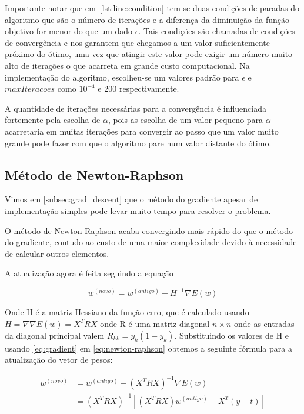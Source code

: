 Importante notar que em~\ref{lst:line:condition} tem-se duas condições de paradas do algoritmo que
são o número de iterações e a diferença da diminuição da função objetivo for menor do que
um dado $\epsilon$. Tais condições são chamadas de condições de convergência e nos garantem
que chegamos a um valor suficientemente próximo do ótimo, uma vez que atingir este valor
pode exigir um número muito alto de iterações o que acarreta em grande custo computacional.
 Na implementação do algoritmo, escolheu-se um valores
padrão para $\epsilon$ e $maxIteracoes$ como $10^{-4}$ e $200$ respectivamente.

A quantidade de iterações necessárias para a convergência é influenciada fortemente pela
escolha de $\alpha$, pois as escolha de um valor pequeno para $\alpha$ acarretaria
em muitas iterações para convergir ao passo que um valor muito grande pode fazer
com que o algoritmo pare num valor distante do ótimo.


\subsection{Método de Newton-Raphson}
\label{subsec:newton-raphson}

Vimos em \ref{subsec:grad_descent} que o método do gradiente apesar de implementação
simples pode levar muito tempo para resolver o problema.

O método de Newton-Raphson acaba convergindo mais rápido do que o método do gradiente,
contudo ao custo de uma maior complexidade devido à necessidade de calcular outros
elementos.

A atualização agora é feita seguindo a equação

\begin{center}
	\begin{equation}\label{eq:newton-raphson}
		w^{ (novo) } = w^{ (antigo) } - H^{-1} \nabla E(w)
	\end{equation}
\end{center}

Onde H é a matriz Hessiano da função erro, que é calculado usando $H = \nabla \nabla E(w)
= X^TRX$ onde R é uma matriz diagonal $n \times n$ onde as entradas da diagonal principal
valem $R_{kk} = y_k(1 - y_k)$. Substituindo os valores de H e usando
\ref{eq:gradient} em \ref{eq:newton-raphson} obtemos a seguinte fórmula para a atualização
do vetor de pesos:


\begin{equation}
\begin{split}
w^{ (novo) } & = w^{ (antigo) } - (X^T R X)^{-1} \nabla E(w) \\
	& = (X^T R X)^{-1}[(X^T R X)w^{ (antigo) } - X^T(y - t)]  
\end{split}
\end{equation}

